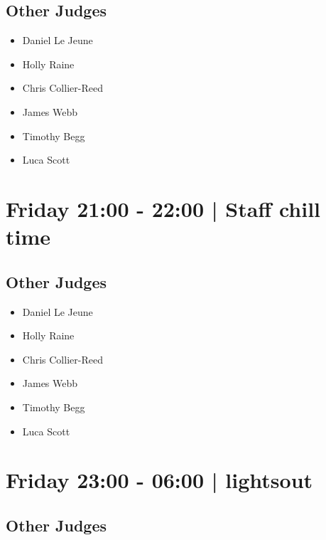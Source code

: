 \documentclass[10pt]{article}
\begin{document}
                
        \subsection*{Other Judges}
        
            \begin{itemize}
                            \item Daniel Le Jeune
                            \item Holly Raine
                            \item Chris Collier-Reed
                            \item James Webb
                            \item Timothy Begg
                            \item Luca Scott
                        \end{itemize}
        

            \section*{Friday 21:00
        -
        22:00
        |
         Staff chill time}
        
                
        \subsection*{Other Judges}
        
            \begin{itemize}
                            \item Daniel Le Jeune
                            \item Holly Raine
                            \item Chris Collier-Reed
                            \item James Webb
                            \item Timothy Begg
                            \item Luca Scott
                        \end{itemize}
        

            \section*{Friday 23:00
        -
        06:00
        |
         lightsout}
        
                
        \subsection*{Other Judges}
        
\end{document}
